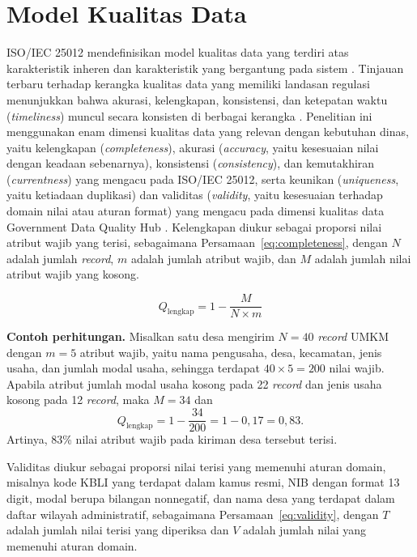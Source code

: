 \section{Model Kualitas Data}
\label{sec:kualitas}

ISO/IEC 25012 mendefinisikan model kualitas data yang terdiri atas karakteristik inheren dan karakteristik yang bergantung pada sistem \cite{iso25012}. Tinjauan terbaru terhadap kerangka kualitas data yang memiliki landasan regulasi menunjukkan bahwa akurasi, kelengkapan, konsistensi, dan ketepatan waktu (\textit{timeliness}) muncul secara konsisten di berbagai kerangka \cite{miller2025dq}. Penelitian ini menggunakan enam dimensi kualitas data yang relevan dengan kebutuhan dinas, yaitu kelengkapan (\textit{completeness}), akurasi (\textit{accuracy}, yaitu kesesuaian nilai dengan keadaan sebenarnya), konsistensi (\textit{consistency}), dan kemutakhiran (\textit{currentness}) yang mengacu pada ISO/IEC 25012, serta keunikan (\textit{uniqueness}, yaitu ketiadaan duplikasi) dan validitas (\textit{validity}, yaitu kesesuaian terhadap domain nilai atau aturan format) yang mengacu pada dimensi kualitas data Government Data Quality Hub \cite{govuk2021dqdimensions}. Kelengkapan diukur sebagai proporsi nilai atribut wajib yang terisi, sebagaimana Persamaan~\eqref{eq:completeness}, dengan $N$ adalah jumlah \textit{record}, $m$ adalah jumlah atribut wajib, dan $M$ adalah jumlah nilai atribut wajib yang kosong.

\begin{equation}
  Q_{\text{lengkap}} = 1 - \frac{M}{N \times m}
  \label{eq:completeness}
\end{equation}

\noindent\textbf{Contoh perhitungan.} Misalkan satu desa mengirim $N = 40$ \textit{record} UMKM dengan $m = 5$ atribut wajib, yaitu nama pengusaha, desa, kecamatan, jenis usaha, dan jumlah modal usaha, sehingga terdapat $40 \times 5 = 200$ nilai wajib. Apabila atribut jumlah modal usaha kosong pada 22 \textit{record} dan jenis usaha kosong pada 12 \textit{record}, maka $M = 34$ dan
\[
  Q_{\text{lengkap}} = 1 - \frac{34}{200} = 1 - 0{,}17 = 0{,}83.
\]
Artinya, 83\% nilai atribut wajib pada kiriman desa tersebut terisi.

Validitas diukur sebagai proporsi nilai terisi yang memenuhi aturan domain, misalnya kode KBLI yang terdapat dalam kamus resmi, NIB dengan format 13 digit, modal berupa bilangan nonnegatif, dan nama desa yang terdapat dalam daftar wilayah administratif, sebagaimana Persamaan~\eqref{eq:validity}, dengan $T$ adalah jumlah nilai terisi yang diperiksa dan $V$ adalah jumlah nilai yang memenuhi aturan domain.

